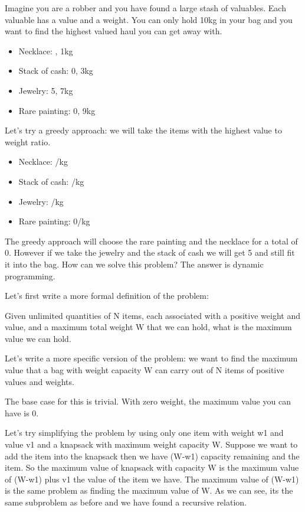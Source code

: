 \documentclass[11pt,oneside]{book}
\begin{document}
Imagine you are a robber and you have found a large stash of valuables. Each valuable has a value and a weight. You can only hold 10kg in your bag and you want to find the highest valued haul you can get away with.

\begin{itemize}
\item Necklace: , 1kg
\item Stack of cash: 0, 3kg
\item Jewelry: 5, 7kg
\item Rare painting: 0, 9kg
\end{itemize}

Let's try a greedy approach: we will take the items with the highest value to weight ratio.

\begin{itemize}
\item Necklace: /kg
\item Stack of cash: /kg
\item Jewelry: /kg
\item Rare painting: 0/kg
\end{itemize}

The greedy approach will choose the rare painting and the necklace for a total of 0. However if we take the jewelry and the stack of cash we will get 5 and still fit it into the bag. How can we solve this problem? The answer is dynamic programming.

Let's first write a more formal definition of the problem:

Given unlimited quantities of N items, each associated with a positive weight and value, and a maximum total weight W that we can hold, what is the maximum value we can hold.

Let's write a more specific version of the problem: we want to find the maximum value that a bag with weight capacity W can carry out of N items of positive values and weights.

The base case for this is trivial. With zero weight, the maximum value you can have is 0.

Let's try simplifying the problem by using only one item with weight w1 and value v1 and a knapsack with maximum weight capacity W. Suppose we want to add the item into the knapsack then we have (W-w1) capacity remaining and the item. So the maximum value of knapsack with capacity W is the maximum value of (W-w1) plus v1 the value of the item we have. The maximum value of (W-w1) is the same problem as finding the maximum value of W. As we can see, its the same subproblem as before and we have found a recursive relation.
\end{document}
